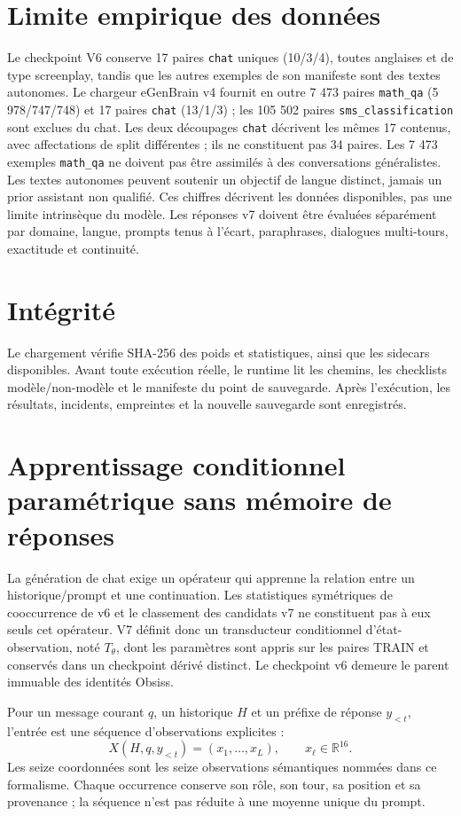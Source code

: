 \documentclass[11pt,a4paper]{report}
\newcommand{\R}{\mathbb{R}}
\begin{document}
\section{Limite empirique des données}
Le checkpoint V6 conserve 17 paires \texttt{chat} uniques (10/3/4), toutes anglaises et de type screenplay, tandis que les autres exemples de son manifeste sont des textes autonomes. Le chargeur eGenBrain v4 fournit en outre 7 473 paires \texttt{math\_qa} (5 978/747/748) et 17 paires \texttt{chat} (13/1/3) ; les 105 502 paires \texttt{sms\_classification} sont exclues du chat. Les deux découpages \texttt{chat} décrivent les mêmes 17 contenus, avec affectations de split différentes ; ils ne constituent pas 34 paires. Les 7 473 exemples \texttt{math\_qa} ne doivent pas être assimilés à des conversations généralistes. Les textes autonomes peuvent soutenir un objectif de langue distinct, jamais un prior assistant non qualifié. Ces chiffres décrivent les données disponibles, pas une limite intrinsèque du modèle. Les réponses v7 doivent être évaluées séparément par domaine, langue, prompts tenus à l'écart, paraphrases, dialogues multi-tours, exactitude et continuité.

\section{Intégrité}
Le chargement vérifie SHA-256 des poids et statistiques, ainsi que les sidecars disponibles. Avant toute exécution réelle, le runtime lit les chemins, les checklists modèle/non-modèle et le manifeste du point de sauvegarde. Après l'exécution, les résultats, incidents, empreintes et la nouvelle sauvegarde sont enregistrés.


\section{Apprentissage conditionnel paramétrique sans mémoire de réponses}
\label{sec:conditional-transducer}
La génération de chat exige un opérateur qui apprenne la relation entre un historique/prompt et une continuation. Les statistiques symétriques de cooccurrence de v6 et le classement des candidats v7 ne constituent pas à eux seuls cet opérateur. V7 définit donc un transducteur conditionnel d'état-observation, noté $T_\theta$, dont les paramètres sont appris sur les paires TRAIN et conservés dans un checkpoint dérivé distinct. Le checkpoint v6 demeure le parent immuable des identités Obsiss.

Pour un message courant $q$, un historique $H$ et un préfixe de réponse $y_{<t}$, l'entrée est une séquence d'observations explicites :
\[
X(H,q,y_{<t})=(x_1,\ldots,x_L),\qquad x_\ell\in\R^{16}.
\]
Les seize coordonnées sont les seize observations sémantiques nommées dans ce formalisme. Chaque occurrence conserve son rôle, son tour, sa position et sa provenance ; la séquence n'est pas réduite à une moyenne unique du prompt.
\end{document}
